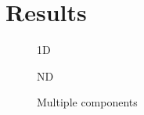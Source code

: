 \section{Results}

\begin{figure}
  \center
  
  \caption{1D}
  \label{fig:speedup1d}
\end{figure}

\begin{figure}
  \center
  
  \caption{ND}
  \label{fig:speedupnd}
\end{figure}

\begin{figure}
  \center
  
  \caption{Multiple components}
  \label{fig:speedupncomps}
\end{figure}
